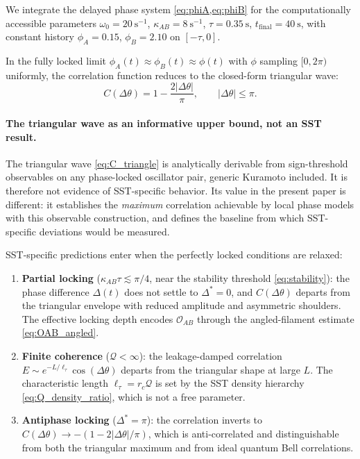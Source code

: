 \documentclass[11pt]{article}
\begin{document}
We integrate the delayed phase system \cref{eq:phiA,eq:phiB} for the computationally accessible parameters $\omega_0 = 20~\mathrm{s^{-1}}$, $\kappa_{AB} = 8~\mathrm{s^{-1}}$, $\tau = 0.35~\mathrm{s}$, $t_{\mathrm{final}} = 40~\mathrm{s}$, with constant history $\phi_A = 0.15$, $\phi_B = 2.10$ on $[-\tau, 0]$.

In the fully locked limit $\phi_A(t) \approx \phi_B(t) \approx \phi(t)$ with $\phi$ sampling $[0,2\pi)$ uniformly, the correlation function reduces to the closed-form triangular wave:
\begin{equation}
    C(\Delta\theta) = 1 - \frac{2|\Delta\theta|}{\pi}, \qquad |\Delta\theta| \le \pi.
    \label{eq:C_triangle}
\end{equation}

\paragraph{The triangular wave as an informative upper bound, not an SST result.}

The triangular wave \cref{eq:C_triangle} is analytically derivable from sign-threshold observables on any phase-locked oscillator pair, generic Kuramoto included. It is therefore not evidence of SST-specific behavior. Its value in the present paper is different: it establishes the \emph{maximum} correlation achievable by local phase models with this observable construction, and defines the baseline from which SST-specific deviations would be measured.

SST-specific predictions enter when the perfectly locked conditions are relaxed:

\begin{enumerate}[label=(\roman*)]
    \item \textbf{Partial locking} ($\kappa_{AB}\tau \lesssim \pi/4$, near the stability threshold \cref{eq:stability}): the phase difference $\Delta(t)$ does not settle to $\Delta^\ast = 0$, and $C(\Delta\theta)$ departs from the triangular envelope with reduced amplitude and asymmetric shoulders. The effective locking depth encodes $\mathcal{O}_{AB}$ through the angled-filament estimate \cref{eq:OAB_angled}.

    \item \textbf{Finite coherence} ($\mathcal{Q} < \infty$): the leakage-damped correlation $E \sim e^{-L/\ell_\tau}\cos(\Delta\theta)$ departs from the triangular shape at large $L$. The characteristic length $\ell_\tau = r_c\mathcal{Q}$ is set by the SST density hierarchy \cref{eq:Q_density_ratio}, which is not a free parameter.

    \item \textbf{Antiphase locking} ($\Delta^\ast = \pi$): the correlation inverts to $C(\Delta\theta) \to -(1 - 2|\Delta\theta|/\pi)$, which is anti-correlated and distinguishable from both the triangular maximum and from ideal quantum Bell correlations.
\end{enumerate}
\end{document}
